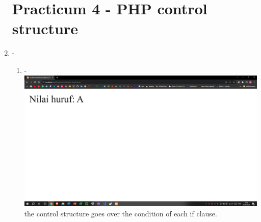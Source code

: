 \documentclass[12pt,titlepage]{article}
\begin{document}
\begin{enumerate}[label*=\arabic*.]
    \section*{Practicum 4  - PHP control structure}
    \item -
    \begin{enumerate}[label*=\arabic*.]
        \item - \\ \includegraphics[width=.8\textwidth]{images/figures/fig8.png} \\ the control structure goes over the condition of each if clause.
    \end{enumerate}
\end{enumerate}
\end{document}
